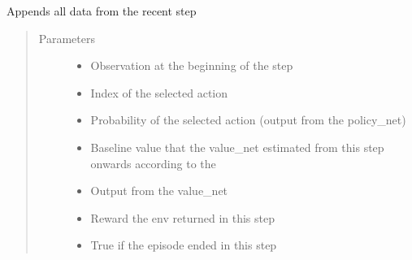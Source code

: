 \documentclass[letterpaper,10pt,english]{sphinxmanual}
\begin{document}
\begin{fulllineitems}
\begin{fulllineitems}
\label{\detokenize{agents.reinforcement_learning:agents.reinforcement_learning.ppo.RolloutBuffer.store_memory}}
\sphinxAtStartPar
Appends all data from the recent step
\begin{quote}\begin{description}
\item[{Parameters}] \leavevmode\begin{itemize}
\item {} 
\sphinxAtStartPar
{} \textendash{} Observation at the beginning of the step

\item {} 
\sphinxAtStartPar
{} \textendash{} Index of the selected action

\item {} 
\sphinxAtStartPar
{} \textendash{} Probability of the selected action (output from the policy\_net)

\item {} 
\sphinxAtStartPar
{} \textendash{} Baseline value that the value\_net estimated from this step onwards according to the

\item {} 
\sphinxAtStartPar
{} \textendash{} Output from the value\_net

\item {} 
\sphinxAtStartPar
{} \textendash{} Reward the env returned in this step

\item {} 
\sphinxAtStartPar
{} \textendash{} True if the episode ended in this step

\end{itemize}


\end{description}
\end{quote}
\end{fulllineitems}
\end{fulllineitems}
\end{document}
